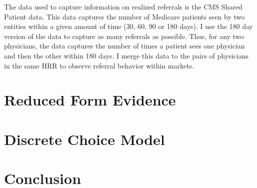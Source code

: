 \documentclass[12pt]{article}
\begin{document}
    The data used to capture information on realized referrals is the CMS Shared Patient data. This data captures the number of Medicare patients seen by two entities within a given amount of time (30, 60, 90 or 180 days). I use the 180 day version of the data to capture as many referrals as possible. Thus, for any two physicians, the data captures the number of times a patient sees one physician and then the other within 180 days. I merge this data to the pairs of physicians in the same HRR to observe referral behavior within markets.  
	
	
    \section{Reduced Form Evidence}






    \section{Discrete Choice Model}





    \section{Conclusion}
	
	
	
\end{document}

